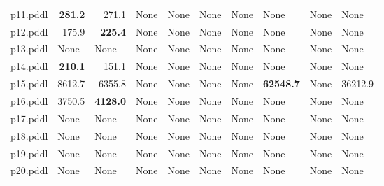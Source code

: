 \documentclass{article}
\begin{document}
\begin{tabular}{@{}lrrrrrrrrr@{}}
p11.pddl & \textbf{281.2} & 271.1 & \multicolumn{1}{|l|}{None} & \multicolumn{1}{|l|}{None} & \multicolumn{1}{|l|}{None} & \multicolumn{1}{|l|}{None} & \multicolumn{1}{|l|}{None} & \multicolumn{1}{|l|}{None} & \multicolumn{1}{|l|}{None} \\
p12.pddl & 175.9 & \textbf{225.4} & \multicolumn{1}{|l|}{None} & \multicolumn{1}{|l|}{None} & \multicolumn{1}{|l|}{None} & \multicolumn{1}{|l|}{None} & \multicolumn{1}{|l|}{None} & \multicolumn{1}{|l|}{None} & \multicolumn{1}{|l|}{None} \\
p13.pddl & \multicolumn{1}{|l|}{None} & \multicolumn{1}{|l|}{None} & \multicolumn{1}{|l|}{None} & \multicolumn{1}{|l|}{None} & \multicolumn{1}{|l|}{None} & \multicolumn{1}{|l|}{None} & \multicolumn{1}{|l|}{None} & \multicolumn{1}{|l|}{None} & \multicolumn{1}{|l|}{None} \\
p14.pddl & \textbf{210.1} & 151.1 & \multicolumn{1}{|l|}{None} & \multicolumn{1}{|l|}{None} & \multicolumn{1}{|l|}{None} & \multicolumn{1}{|l|}{None} & \multicolumn{1}{|l|}{None} & \multicolumn{1}{|l|}{None} & \multicolumn{1}{|l|}{None} \\
p15.pddl & 8612.7 & 6355.8 & \multicolumn{1}{|l|}{None} & \multicolumn{1}{|l|}{None} & \multicolumn{1}{|l|}{None} & \multicolumn{1}{|l|}{None} & \textbf{62548.7} & \multicolumn{1}{|l|}{None} & 36212.9 \\
p16.pddl & 3750.5 & \textbf{4128.0} & \multicolumn{1}{|l|}{None} & \multicolumn{1}{|l|}{None} & \multicolumn{1}{|l|}{None} & \multicolumn{1}{|l|}{None} & \multicolumn{1}{|l|}{None} & \multicolumn{1}{|l|}{None} & \multicolumn{1}{|l|}{None} \\
p17.pddl & \multicolumn{1}{|l|}{None} & \multicolumn{1}{|l|}{None} & \multicolumn{1}{|l|}{None} & \multicolumn{1}{|l|}{None} & \multicolumn{1}{|l|}{None} & \multicolumn{1}{|l|}{None} & \multicolumn{1}{|l|}{None} & \multicolumn{1}{|l|}{None} & \multicolumn{1}{|l|}{None} \\
p18.pddl & \multicolumn{1}{|l|}{None} & \multicolumn{1}{|l|}{None} & \multicolumn{1}{|l|}{None} & \multicolumn{1}{|l|}{None} & \multicolumn{1}{|l|}{None} & \multicolumn{1}{|l|}{None} & \multicolumn{1}{|l|}{None} & \multicolumn{1}{|l|}{None} & \multicolumn{1}{|l|}{None} \\
p19.pddl & \multicolumn{1}{|l|}{None} & \multicolumn{1}{|l|}{None} & \multicolumn{1}{|l|}{None} & \multicolumn{1}{|l|}{None} & \multicolumn{1}{|l|}{None} & \multicolumn{1}{|l|}{None} & \multicolumn{1}{|l|}{None} & \multicolumn{1}{|l|}{None} & \multicolumn{1}{|l|}{None} \\
p20.pddl & \multicolumn{1}{|l|}{None} & \multicolumn{1}{|l|}{None} & \multicolumn{1}{|l|}{None} & \multicolumn{1}{|l|}{None} & \multicolumn{1}{|l|}{None} & \multicolumn{1}{|l|}{None} & \multicolumn{1}{|l|}{None} & \multicolumn{1}{|l|}{None} & \multicolumn{1}{|l|}{None} \\
\end{tabular}
\end{document}
